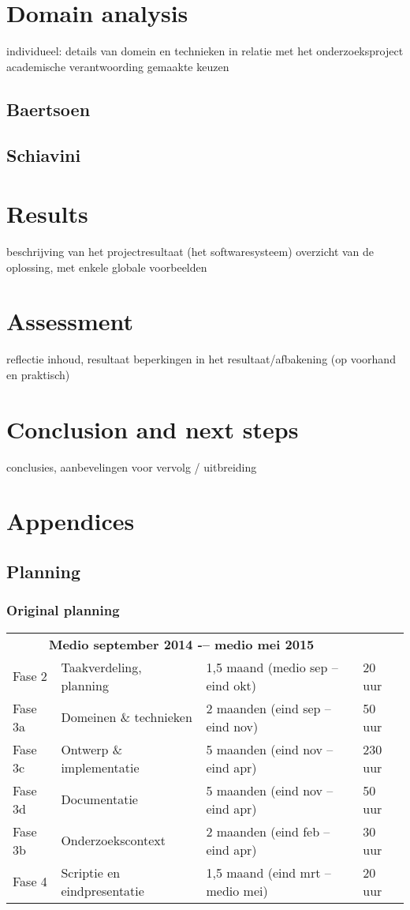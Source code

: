 \documentclass[a4paper,12pt,abstracton,titlepage]{scrartcl}
\begin{document}
\section{Domain analysis}
individueel:  details van domein en technieken in relatie met het onderzoeksproject
academische verantwoording gemaakte keuzen

\subsection{Baertsoen}
\lipsum[1]

\subsection{Schiavini}
\lipsum[1]

\section{Results}
beschrijving van het projectresultaat (het softwaresysteem)
overzicht van de oplossing, met enkele globale voorbeelden

\section{Assessment}
reflectie inhoud, resultaat
beperkingen in het resultaat/afbakening (op voorhand en praktisch) 

\section{Conclusion and next steps}
conclusies, aanbevelingen voor vervolg / uitbreiding

\newpage
\appendix
\section{Appendices}
\subsection{Planning}
\subsubsection{Original planning}
\begin{tabular}{ l l l l }
  \multicolumn{3}{c}{\textbf{Medio september 2014 -– medio mei 2015}} & \\
Fase 2 & Taakverdeling, planning & 1,5 maand (medio sep -- eind okt)          & 20 uur \\
Fase 3a & Domeinen \& technieken & 2 maanden (eind sep -- eind nov)       & 50 uur \\
Fase 3c & Ontwerp \& implementatie & 5 maanden (eind nov -- eind apr)                & 230 uur \\
Fase 3d & Documentatie & 5 maanden (eind nov -- eind apr)                & 50 uur \\
Fase 3b & Onderzoekscontext & 2 maanden (eind feb -- eind apr)                   & 30 uur \\
Fase 4  & Scriptie en eindpresentatie & 1,5 maand (eind mrt -- medio mei)                      & 20 uur
\end{tabular}
\end{document}
